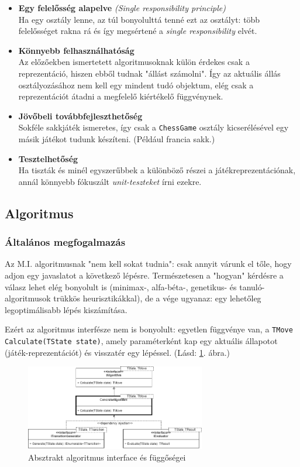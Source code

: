 \documentclass[twoside, a4paper, 12pt]{article}
\begin{document}
\begin{itemize}
	\item \textbf{Egy felelősség alapelve} \textit{(Single responsibility principle)}\cite{SingleResponsibilityHu}~\cite{SingleResponsibilityEn}~\cite{SOLID}~ \\
	Ha egy osztály lenne, az túl bonyolulttá tenné ezt az osztályt: több felelősséget rakna rá és így megsértené a \textit{single responsibility} elvét.
	\item \textbf{Könnyebb felhasználhatóság} \\
	Az előzőekben ismertetett algoritmusoknak külön érdekes csak a reprezentáció, hiszen ebből tudnak "állást számolni". Így az aktuális állás osztályozásához nem kell egy mindent tudó objektum, elég csak a reprezentációt átadni a megfelelő kiértékelő függvénynek.
	\item \textbf{Jövőbeli továbbfejleszthetőség} \\
	Sokféle sakkjáték ismeretes, így csak a \texttt{ChessGame} osztály kicserélésével egy másik játékot tudunk készíteni. (Például francia sakk.)
	\item \textbf{Tesztelhetőség} \\
	Ha tiszták és minél egyszerűbbek a különböző részei a játékreprezentációnak, annál könnyebb fókuszált \textit{unit-teszteket} írni ezekre.
\end{itemize}

\subsection{Algoritmus}

\subsubsection{Általános megfogalmazás}
Az M.I. algoritmusnak "nem kell sokat tudnia": csak annyit várunk el tőle, hogy adjon egy javaslatot a következő lépésre. Természetesen a "hogyan" kérdésre a válasz lehet elég bonyolult is (minimax-, alfa-béta-, genetikus- és tanuló-algoritmusok trükkös heurisztikákkal), de a vége ugyanaz: egy lehetőleg legoptimálisabb lépés kiszámítása.

Ezért az algoritmus interfésze nem is bonyolult: egyetlen függvénye van, a \texttt{TMove Calculate(TState state)}, amely paraméterként kap egy aktuális állapotot (játék-reprezentációt) és visszatér egy lépéssel. (Lásd: \ref{fig:algorithmAbstractDiagram}. ábra.)

\begin{figure}[htbp]
	\centering
	\includegraphics[width=0.7\textwidth]{img/algorithmAbstractDiagram.png}
	\caption{Absztrakt algoritmus interface és függőségei}
	\label{fig:algorithmAbstractDiagram}
\end{figure}
\end{document}
